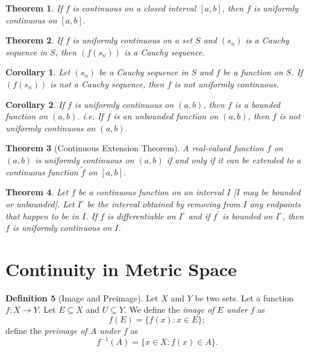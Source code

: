 \documentclass[12pt, lettersize]{book}
\theoremstyle{plain}
\newtheorem{thm}{Theorem}[section]
\newtheorem{cor}{Corollary}[thm]
\theoremstyle{definition}
\newtheorem{dfn}[thm]{Definition}
\theoremstyle{remark}
\begin{document}
		\begin{thm}\label{def:19.2}
			If $f$ is continuous on a closed interval $[a,b]$, then $f$ is uniformly continuous on $[a,b]$.
		\end{thm}
		
		\begin{thm}\label{thm:19.4}
			If $f$ is uniformly continuous on a set $S$ and $(s_n)$ is a Cauchy sequence in $S$, then $(f(s_n))$ is a 
			Cauchy sequence.
		\end{thm}
		\begin{cor}
			Let $(s_n)$ be a Cauchy sequence in $S$ and $f$ be a function on $S$. If $(f(s_n))$ is not a Cauchy sequence, then $f$ is not \emph{uniformly continuous}.
		\end{cor}
		\begin{cor}
			If $f$ is uniformly continuous on $(a,b)$, then $f$ is a bounded function on $(a,b)$. i.e. If $f$ is an unbounded function on $(a,b)$, then $f$ is not uniformly continuous on $(a,b)$.
		\end{cor}
		
		\setcounter{equation}{0}
		\begin{thm}[Continuous Extension Theorem]\label{def:19.5}
			A real-valued function $f$ on $(a,b)$ is uniformly continuous on $(a,b)$ if and only if it can be extended to
			a continuous function $\tilde{f}$ on $[a,b]$.
		\end{thm}
		
		\begin{thm}
			Let $f$ be a continuous function on an interval $I$ [$I$ may be bounded or unbounded]. Let $I^\circ$ be the
			interval obtained by removing from $I$ any endpoints that happen to be in $I$. If $f$ is differentiable on
			$I^\circ$ and if $f^\prime$ is bounded on $I^\circ$, then $f$ is uniformly continuous on $I$.
		\end{thm}
		\newpage
		
		\section{Continuity in Metric Space}
		\begin{dfn}[Image and Preimage]
			Let $X$ and $Y$ be two sets. Let a function $f: X\rightarrow Y$. Let $E\subseteq X$ and $U\subseteq Y$. We define the \emph{image of $E$ under $f$} as
			\begin{displaymath}
				f(E)=\{f(x): x\in E\};
			\end{displaymath}
			define the \emph{preimage of $A$ under $f$} as
			\begin{displaymath}
				f^{-1}(A)=\{x\in X: f(x)\in A\}.
			\end{displaymath}
		\end{dfn}
		
\end{document}
